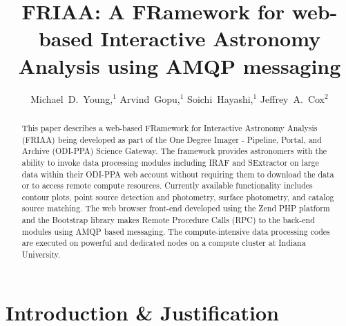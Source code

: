 
\resetcounters


\title{FRIAA: A FRamework for web-based Interactive Astronomy Analysis using AMQP messaging}
\author{Michael~D.~Young,$^1$ Arvind~Gopu,$^1$ Soichi~Hayashi,$^1$ Jeffrey~A.~Cox$^2$
}


\begin{abstract}
This paper describes a web-based FRamework for Interactive Astronomy Analysis (FRIAA) being developed as part of the One Degree Imager - Pipeline, Portal, and Archive (ODI-PPA) Science Gateway. The framework provides astronomers with the ability to invoke data processing modules including IRAF and SExtractor on large data within their ODI-PPA web account without requiring them to download the data or to access remote compute resources. Currently available functionality includes contour plots, point source detection and photometry, surface photometry, and catalog source matching. The web browser front-end developed using the Zend PHP platform and the Bootstrap library makes Remote Procedure Calls (RPC) to the back-end modules using AMQP based messaging. The compute-intensive data processing codes are executed on powerful and dedicated nodes on a compute cluster at Indiana University. 

\end{abstract}

\section{Introduction \& Justification}
\label{section:intro}

